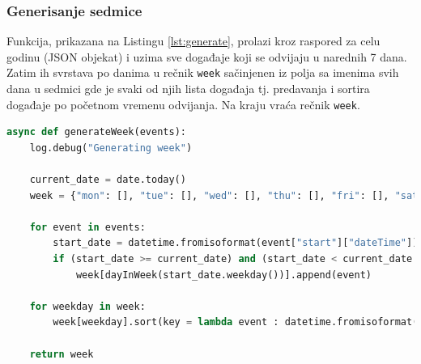 \documentclass[a4paper,11pt]{article}
\begin{document}
\subsubsection{Generisanje sedmice}
Funkcija, prikazana na Listingu \ref{lst:generate}, prolazi kroz raspored za celu godinu (JSON objekat) i uzima sve događaje koji se odvijaju u narednih 7 dana. Zatim ih svrstava po danima u rečnik \texttt{week} sačinjenen iz polja sa imenima svih dana u sedmici gde je svaki od njih lista događaja tj. predavanja i sortira događaje po početnom vremenu odvijanja. Na kraju vraća rečnik \texttt{week}.
\begin{lstlisting}[language=Python, caption=Generisanje sedmice, label=lst:generate]
async def generateWeek(events):
    log.debug("Generating week")

    current_date = date.today()
    week = {"mon": [], "tue": [], "wed": [], "thu": [], "fri": [], "sat": [], "sun": []}

    for event in events:
        start_date = datetime.fromisoformat(event["start"]["dateTime"]).date()
        if (start_date >= current_date) and (start_date < current_date + timedelta(days=7)):
            week[dayInWeek(start_date.weekday())].append(event)

    for weekday in week:
        week[weekday].sort(key = lambda event : datetime.fromisoformat(event["start"]["dateTime"]))

    return week
\end{lstlisting}
\newpage
\end{document}
